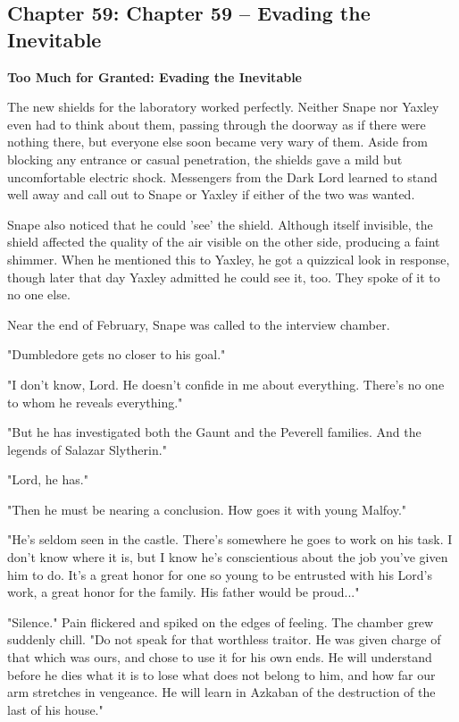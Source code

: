 \documentclass[a4paper,11pt]{article}
\begin{document}
\subsection{Chapter 59: Chapter 59 – Evading the Inevitable}

\textbf{Too Much for Granted: Evading the Inevitable}

The new shields for the laboratory worked perfectly. Neither Snape nor Yaxley even had to think about them, passing through the doorway as if there were nothing there, but everyone else soon became very wary of them. Aside from blocking any entrance or casual penetration, the shields gave a mild but uncomfortable electric shock. Messengers from the Dark Lord learned to stand well away and call out to Snape or Yaxley if either of the two was wanted.

Snape also noticed that he could 'see' the shield. Although itself invisible, the shield affected the quality of the air visible on the other side, producing a faint shimmer. When he mentioned this to Yaxley, he got a quizzical look in response, though later that day Yaxley admitted he could see it, too. They spoke of it to no one else.

Near the end of February, Snape was called to the interview chamber.

"Dumbledore gets no closer to his goal."

"I don't know, Lord. He doesn't confide in me about everything. There's no one to whom he reveals everything."

"But he has investigated both the Gaunt and the Peverell families. And the legends of Salazar Slytherin."

"Lord, he has."

"Then he must be nearing a conclusion. How goes it with young Malfoy."

"He's seldom seen in the castle. There's somewhere he goes to work on his task. I don't know where it is, but I know he's conscientious about the job you've given him to do. It's a great honor for one so young to be entrusted with his Lord's work, a great honor for the family. His father would be proud..."

"Silence." Pain flickered and spiked on the edges of feeling. The chamber grew suddenly chill. "Do not speak for that worthless traitor. He was given charge of that which was ours, and chose to use it for his own ends. He will understand before he dies what it is to lose what does not belong to him, and how far our arm stretches in vengeance. He will learn in Azkaban of the destruction of the last of his house."
\end{document}
